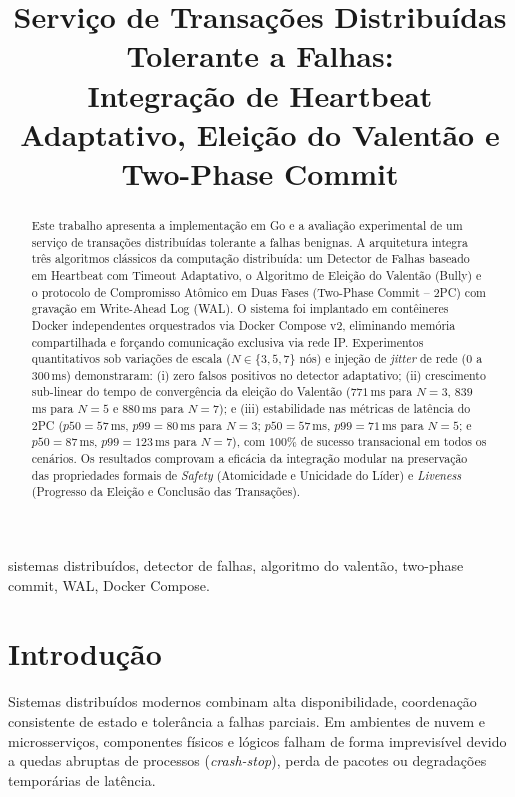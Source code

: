 \documentclass[conference]{IEEEtran}
\title{Serviço de Transações Distribuídas Tolerante a Falhas:\\Integração de Heartbeat Adaptativo, Eleição do Valentão e Two-Phase Commit}
\author{\IEEEauthorblockN{Caio Raphael Teixeira RA:212661, Vitor Takahashi Miranda RA:231740}
\IEEEauthorblockA{Universidade Estadual de Campinas (UNICAMP)\\Campinas, SP, Brasil\\
Repositório: \url{https://github.com/Caiozotex/Projeto2_MC714/tree/main}\\
Vídeo: \url{https://github.com/Caiozotex/Projeto2_MC714/blob/main/experiments/results/ProjetoMC714.mp4}}}
\begin{document}
\maketitle

\begin{abstract}
Este trabalho apresenta a implementação em Go e a avaliação experimental de um serviço de transações distribuídas tolerante a falhas benignas. A arquitetura integra três algoritmos clássicos da computação distribuída: um Detector de Falhas baseado em Heartbeat com Timeout Adaptativo, o Algoritmo de Eleição do Valentão (Bully) e o protocolo de Compromisso Atômico em Duas Fases (Two-Phase Commit -- 2PC) com gravação em Write-Ahead Log (WAL). O sistema foi implantado em contêineres Docker independentes orquestrados via Docker Compose v2, eliminando memória compartilhada e forçando comunicação exclusiva via rede IP. Experimentos quantitativos sob variações de escala ($N \in \{3,5,7\}$ nós) e injeção de \textit{jitter} de rede ($0$ a $300$\,ms) demonstraram: (i) zero falsos positivos no detector adaptativo; (ii) crescimento sub-linear do tempo de convergência da eleição do Valentão ($771$\,ms para $N=3$, $839$\,ms para $N=5$ e $880$\,ms para $N=7$); e (iii) estabilidade nas métricas de latência do 2PC ($p50 = 57$\,ms, $p99 = 80$\,ms para $N=3$; $p50 = 57$\,ms, $p99 = 71$\,ms para $N=5$; e $p50 = 87$\,ms, $p99 = 123$\,ms para $N=7$), com $100\%$ de sucesso transacional em todos os cenários. Os resultados comprovam a eficácia da integração modular na preservação das propriedades formais de \textit{Safety} (Atomicidade e Unicidade do Líder) e \textit{Liveness} (Progresso da Eleição e Conclusão das Transações).
\end{abstract}

\begin{IEEEkeywords}
sistemas distribuídos, detector de falhas, algoritmo do valentão, two-phase commit, WAL, Docker Compose.
\end{IEEEkeywords}

\section{Introdução}
Sistemas distribuídos modernos combinam alta disponibilidade, coordenação consistente de estado e tolerância a falhas parciais. Em ambientes de nuvem e microsserviços, componentes físicos e lógicos falham de forma imprevisível devido a quedas abruptas de processos (\textit{crash-stop}), perda de pacotes ou degradações temporárias de latência.
\end{document}
